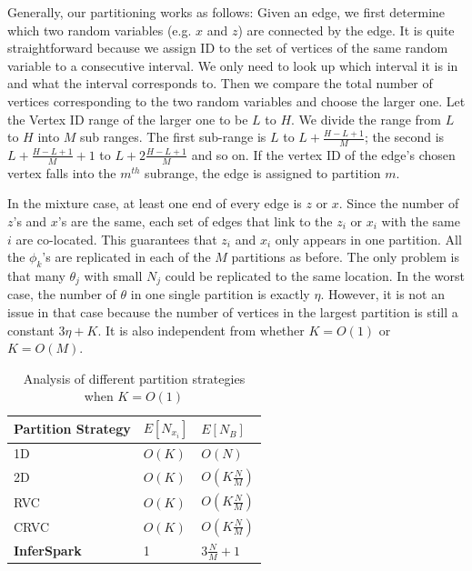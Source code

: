 Generally, our partitioning works as follows: Given an edge, we first determine
which two random variables (e.g. $x$ and $z$) are connected by the edge. It is
quite straightforward because we assign ID to the set of vertices of the same
random variable to a consecutive interval. We only need to look up which
interval it is in and what the interval corresponds to. Then we compare the
total number of vertices corresponding to the two random variables and choose
the larger one. Let the Vertex ID range of the larger one to be $L$ to $H$. We
divide the range from $L$ to $H$ into $M$ sub ranges. The first sub-range is $L$
to $L + \frac{H-L+1}{M}$; the second is $L + \frac{H-L+1}{M} + 1$ to $L +
2\frac{H-L+1}{M}$ and so on. If the vertex ID of the edge's chosen vertex falls
into the $m^{th}$ subrange, the edge is assigned to partition $m$.

In the mixture case, at least one end of every edge is $z$ or $x$. Since
the number of $z$'s and $x$'s are the same, 
each set of edges that link to the $z_i$ or $x_i$ with 
the same $i$ are co-located. This guarantees that $z_i$
and $x_i$ only appears in one partition. All the $\phi_k$'s are replicated in each
of the $M$ partitions as before. The only problem is that many $\theta_j$ with
small $N_j$ could be replicated to the same location. In the worst case, the
number of $\theta$ in one single partition is exactly $\eta$. However, it is
not an issue in that case because the number of vertices in the largest
partition is still a constant $3\eta + K$. It is also independent from whether $K
= O(1)$ or $K = O(M)$.


\begin{table}[h]
	\centering
	\caption{Analysis of different partition strategies when $K = O(1)$}
	\label{tab:max_v_per_edge_part_O1}
	\small
	\begin{tabular}{lll}
		\hline
		Partition Strategy & $E[N_{x_i}]$ & $E[N_B]$\\\hline\hline
		1D & $O(K)$ & $O(N)$ \\\hline
		2D & $O(K)$ & $O(K\frac{N}{M})$ \\\hline
		RVC & $O(K)$ & $O(K\frac{N}{M})$ \\\hline
		CRVC & $O(K)$ & $O(K\frac{N}{M})$ \\\hline
		{\bf InferSpark} & 1 & $3\frac{N}{M}+1$ \\\hline
	\end{tabular}
\end{table}

